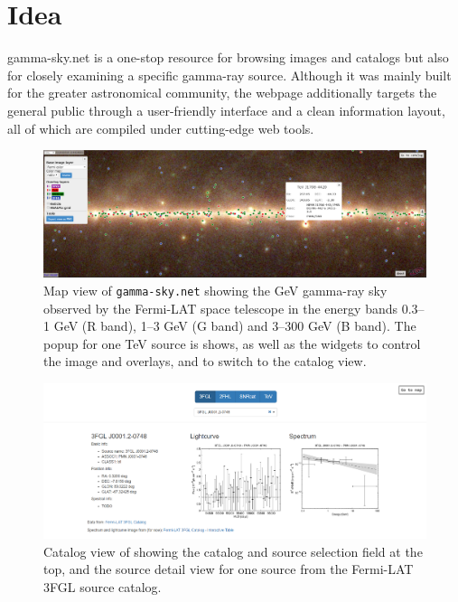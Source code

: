 \section{Idea}

gamma-sky.net is a one-stop resource for browsing images and catalogs but also for closely examining a specific gamma-ray source. Although it was mainly built for the greater astronomical community, the webpage additionally targets the general public through a user-friendly interface and a clean information layout, all of which are compiled under cutting-edge web tools.

\begin{figure}[t]
\centerline{\includegraphics[width=\textwidth]{figures/mapview_wide}}
\caption{Map view of \texttt{gamma-sky.net} showing the GeV gamma-ray sky observed by the Fermi-LAT space telescope in the energy bands 0.3--1 GeV (R band), 1--3 GeV (G band) and 3--300 GeV (B band). The popup for one TeV source is shows, as well as the widgets to control the image and overlays, and to switch to the catalog view.}
\label{fig:mapview}
\end{figure}

\begin{figure}[t]
\centerline{\includegraphics[width=\textwidth]{figures/catview_wide_zoom}}
\caption{Catalog view of \gammasky showing the catalog and source selection field at the top, and the source detail view for one source from the Fermi-LAT 3FGL source catalog.}
\label{fig:catview}
\end{figure}

